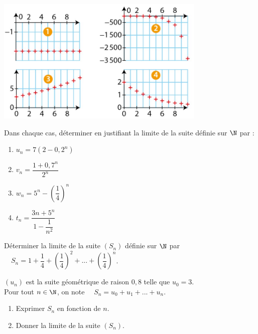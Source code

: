 \documentclass[a4paper,11pt,exos]{nsi} %
\begin{document}
{\includegraphics[width=10cm]{graphique2.jpg}}



\exo{}
Dans chaque cas, déterminer en justifiant la limite de la suite définie sur $\N$ par :
\begin{multicols}{4}
    \begin{enumerate}
        \item $u_n=7\left(2-0,2^n\right)$
        \item $v_n=\dfrac{1+0,7^n}{2^n}$
        \item $w_n=5^n-\left(\dfrac{1}{4}\right)^n$
        \item $t_n=\dfrac{3n+5^n}{1-\dfrac{1}{n^2}}$
    \end{enumerate}
\end{multicols}

\exo{}
Déterminer la limite de la suite $(S_n)$ définie sur $\N$ par $\quad S_n=1+\dfrac{1}{4}+\left(\dfrac{1}{4}\right)^2+...+\left(\dfrac{1}{4}\right)^n$.


\exo{}
$(u_n)$ est la suite géométrique de raison $0,8$ telle que $u_0=3$.\\
Pour tout $n\in\N$, on note $\quad S_n=u_0+u_1+...+u_n$.
\begin{enumerate}
    \item Exprimer $S_n$ en fonction de $n$.
    \item Donner la limite de la suite $(S_n)$.
\end{enumerate}
\end{document}
